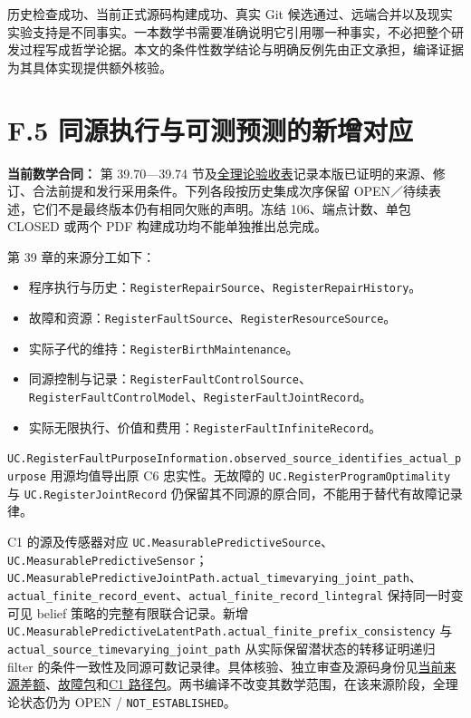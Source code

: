 \documentclass[
  11pt,
  oneside]{book}
\providecommand{\tightlist}{%
  \setlength{\itemsep}{0pt}\setlength{\parskip}{0pt}}
\begin{document}
历史检查成功、当前正式源码构建成功、真实 Git 候选通过、远端合并以及现实实验支持是不同事实。一本数学书需要准确说明它引用哪一种事实，不必把整个研发过程写成哲学论据。本文的条件性数学结论与明确反例先由正文承担，编译证据为其具体实现提供额外核验。

\section{F.5 同源执行与可测预测的新增对应}\label{f.5-ux540cux6e90ux6267ux884cux4e0eux53efux6d4bux9884ux6d4bux7684ux65b0ux589eux5bf9ux5e94}

\textbf{当前数学合同：} 第 39.70---39.74 节及\href{../formalization/ueot-core/docs/compression/theory_completion/unified_closure/whole_theory_formal_closure_v1/FINAL_ACCEPTANCE.md}{全理论验收表}记录本版已证明的来源、修订、合法前提和发行采用条件。下列各段按历史集成次序保留 OPEN／待续表述，它们不是最终版本仍有相同欠账的声明。冻结 106、端点计数、单包 CLOSED 或两个 PDF 构建成功均不能单独推出总完成。

第 39 章的来源分工如下：

\begin{itemize}
\tightlist
\item
  程序执行与历史：\nolinkurl{RegisterRepairSource}、\nolinkurl{RegisterRepairHistory}。
\item
  故障和资源：\nolinkurl{RegisterFaultSource}、\nolinkurl{RegisterResourceSource}。
\item
  实际子代的维持：\nolinkurl{RegisterBirthMaintenance}。
\item
  同源控制与记录：\nolinkurl{RegisterFaultControlSource}、\nolinkurl{RegisterFaultControlModel}、\nolinkurl{RegisterFaultJointRecord}。
\item
  实际无限执行、价值和费用：\nolinkurl{RegisterFaultInfiniteRecord}。
\end{itemize}

\nolinkurl{UC.RegisterFaultPurposeInformation.observed_source_identifies_actual_purpose} 用源均值导出原 C6 忠实性。无故障的 \nolinkurl{UC.RegisterProgramOptimality} 与 \nolinkurl{UC.RegisterJointRecord} 仍保留其不同源的原合同，不能用于替代有故障记录律。

C1 的源及传感器对应 \nolinkurl{UC.MeasurablePredictiveSource}、\nolinkurl{UC.MeasurablePredictiveSensor}；\nolinkurl{UC.MeasurablePredictiveJointPath.actual_timevarying_joint_path}、\nolinkurl{actual_finite_record_event}、\nolinkurl{actual_finite_record_lintegral} 保持同一时变可见 belief 策略的完整有限联合记录。新增 \nolinkurl{UC.MeasurablePredictiveLatentPath.actual_finite_prefix_consistency} 与 \nolinkurl{actual_source_timevarying_joint_path} 从实际保留潜状态的转移证明递归 filter 的条件一致性及同源可数记录律。具体核验、独立审查及源码身份见\href{../formalization/ueot-core/docs/compression/theory_completion/unified_closure/actual_infinite_sources_v1/RESULTS_AND_OPEN_OBLIGATIONS.md}{当前来源差额}、\href{../formalization/ueot-core/docs/compression/theory_completion/unified_closure/register_fault_resources_v1/RESULTS_AND_OPEN_OBLIGATIONS.md}{故障包}和\href{../formalization/ueot-core/docs/compression/theory_completion/unified_closure/c1_joint_path_v1/RESULTS_AND_OPEN_OBLIGATIONS.md}{C1 路径包}。两书编译不改变其数学范围，在该来源阶段，全理论状态仍为 OPEN / \nolinkurl{NOT_ESTABLISHED}。
\end{document}

